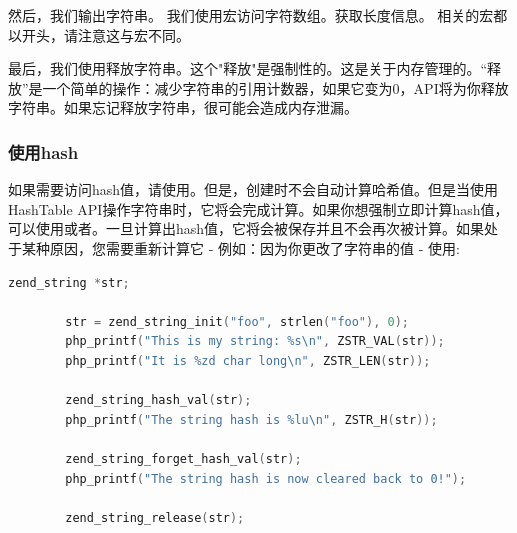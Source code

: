 
然后，我们输出字符串。 我们使用宏访问字符数组。获取长度信息。 相关的宏都以开头，请注意这与宏不同。


最后，我们使用释放字符串。这个"释放"是强制性的。这是关于内存管理的。“释放”是一个简单的操作：减少字符串的引用计数器，如果它变为0，API将为你释放字符串。如果忘记释放字符串，很可能会造成内存泄漏。


\subsubsection{使用hash}

如果需要访问hash值，请使用。但是，创建时不会自动计算哈希值。但是当使用HashTable API操作字符串时，它将会完成计算。如果你想强制立即计算hash值，可以使用或者。一旦计算出hash值，它将会被保存并且不会再次被计算。如果处于某种原因，您需要重新计算它 - 例如：因为你更改了字符串的值 - 使用:



\begin{lstlisting}[language=c]
        zend_string *str;

        str = zend_string_init("foo", strlen("foo"), 0);
        php_printf("This is my string: %s\n", ZSTR_VAL(str));
        php_printf("It is %zd char long\n", ZSTR_LEN(str));
        
        zend_string_hash_val(str);
        php_printf("The string hash is %lu\n", ZSTR_H(str));
        
        zend_string_forget_hash_val(str);
        php_printf("The string hash is now cleared back to 0!");
        
        zend_string_release(str);
\end{lstlisting}



